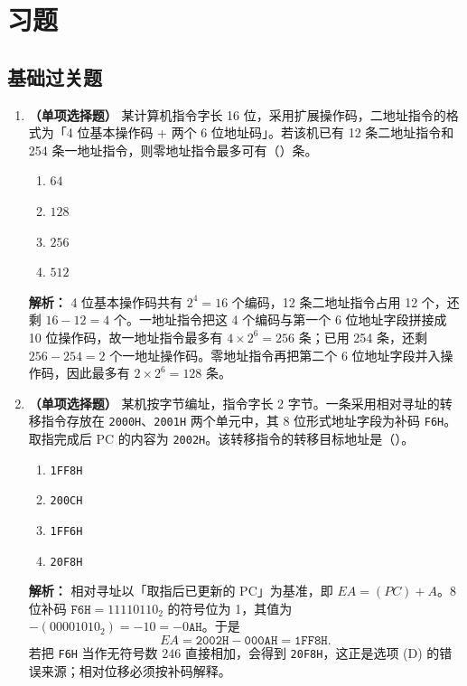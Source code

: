 \section{习题}

\subsection{基础过关题}

\begin{enumerate}[leftmargin=*]

    \item \textbf{（单项选择题）}
    某计算机指令字长 16 位，采用扩展操作码，二地址指令的格式为「4 位基本操作码 + 两个 6 位地址码」。若该机已有 12 条二地址指令和 254 条一地址指令，则零地址指令最多可有（\quad）条。
    \begin{enumerate}[label=(\Alph*)]
        \item $64$
        \item $128$
        \item $256$
        \item $512$
    \end{enumerate}

    \ifshowsolutions\par\noindent\textbf{解析：} 4 位基本操作码共有 $2^4=16$ 个编码，12 条二地址指令占用 12 个，还剩 $16-12=4$ 个。一地址指令把这 4 个编码与第一个 6 位地址字段拼接成 10 位操作码，故一地址指令最多有 $4\times2^6=256$ 条；已用 254 条，还剩 $256-254=2$ 个一地址操作码。零地址指令再把第二个 6 位地址字段并入操作码，因此最多有 $2\times2^6=128$ 条。\else \answerarea \fi

    \vspace{8pt}

    \item \textbf{（单项选择题）}
    某机按字节编址，指令字长 2 字节。一条采用相对寻址的转移指令存放在 \texttt{2000H}、\texttt{2001H} 两个单元中，其 8 位形式地址字段为补码 \texttt{F6H}。取指完成后 PC 的内容为 \texttt{2002H}。该转移指令的转移目标地址是（\quad）。
    \begin{enumerate}[label=(\Alph*)]
        \item \texttt{1FF8H}
        \item \texttt{200CH}
        \item \texttt{1FF6H}
        \item \texttt{20F8H}
    \end{enumerate}

    \ifshowsolutions\par\noindent\textbf{解析：} 相对寻址以「取指后已更新的 PC」为基准，即 $EA=(PC)+A$。8 位补码 $\texttt{F6H}=11110110_2$ 的符号位为 1，其值为 $-(00001010_2)=-10=-0\texttt{AH}$。于是
    \[
    EA=\texttt{2002H}-\texttt{000AH}=\texttt{1FF8H}.
    \]
    若把 \texttt{F6H} 当作无符号数 $246$ 直接相加，会得到 \texttt{20F8H}，这正是选项 (D) 的错误来源；相对位移必须按补码解释。\else \answerarea \fi


\end{enumerate}

